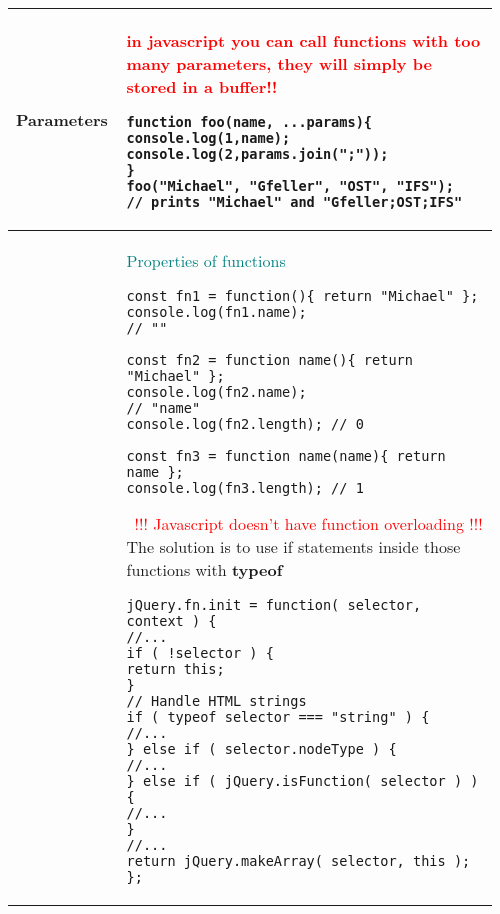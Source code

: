 \documentclass[main.tex,fontsize=8pt,paper=a4,paper=portrait,DIV=calc,]{scrartcl}
\begin{document}
\pagebreak
\begin{table}[ht!]
\begin{tabular}{|m{0.2\linewidth}|m{0.755\linewidth}|}
\hline
Parameters & 
\large\textcolor{red}{in javascript you can call functions with too many parameters, they will simply be stored in a buffer!!}\newline
\normalsize
\begin{lstlisting}
function foo(name, ...params){
console.log(1,name);
console.log(2,params.join(";"));
}
foo("Michael", "Gfeller", "OST", "IFS");
// prints "Michael" and "Gfeller;OST;IFS"
\end{lstlisting}\\
\hline
& \large \textcolor{teal}{Properties of functions}\newline
\normalsize
\begin{lstlisting}
const fn1 = function(){ return "Michael" };
console.log(fn1.name);
// ""

const fn2 = function name(){ return "Michael" };
console.log(fn2.name);
// "name"
console.log(fn2.length); // 0

const fn3 = function name(name){ return name };
console.log(fn3.length); // 1
\end{lstlisting}
\, \newline
\large \textcolor{red}{!!! Javascript doesn't have function overloading !!!}\newline
\normalsize The solution is to use if statements inside those functions with \textbf{typeof}\newline
\begin{lstlisting}
jQuery.fn.init = function( selector, context ) {
//...
if ( !selector ) {
return this;
}
// Handle HTML strings
if ( typeof selector === "string" ) {
//...
} else if ( selector.nodeType ) {
//...
} else if ( jQuery.isFunction( selector ) ) {
//...
}
//...
return jQuery.makeArray( selector, this );
};
\end{lstlisting}\\
\hline
\end{tabular}
\end{table}
\pagebreak
\end{document}
